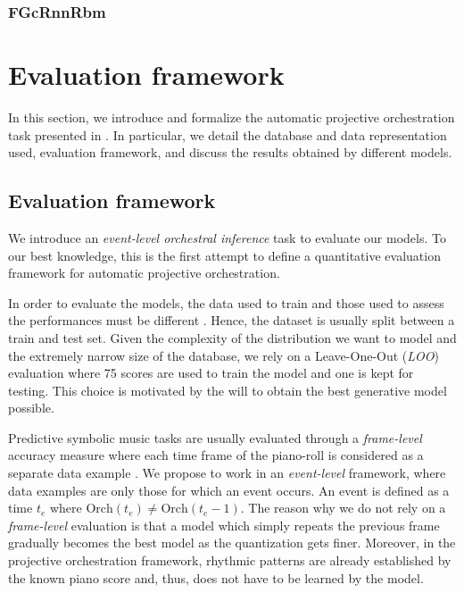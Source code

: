 \documentclass{article}
\begin{document}
\subsubsection{FGcRnnRbm}

\section{Evaluation framework}
In this section, we introduce and formalize the automatic projective orchestration task presented in . In particular, we detail the database and data representation used, evaluation framework, and discuss the results obtained by different models.

\subsection{Evaluation framework}
We introduce an \textit{event-level orchestral inference} task to evaluate our models. To our best knowledge, this is the first attempt to define a quantitative evaluation framework for automatic projective orchestration.

In order to evaluate the models, the data used to train and those used to assess the performances must be different \cite{bishop2006pattern}. Hence, the dataset is usually split between a train and test set.
Given the complexity of the distribution we want to model and the extremely narrow size of the database, we rely on a Leave-One-Out (\textit{LOO}) evaluation where 75 scores are used to train the model and one is kept for testing. This choice is motivated by the will to obtain the best generative model possible.

Predictive symbolic music tasks are usually evaluated through a \textit{frame-level} accuracy measure where each time frame of the piano-roll is considered as a separate data example \cite{DBLP:journals/corr/YaoCVDD15,boulanger2012modeling,lavrenko2003polyphonic}.
We propose to work in an \textit{event-level} framework, where data examples are only those for which an event occurs. An event is defined as a time $t_{e}$ where $\text{Orch}(t_{e}) \neq \text{Orch}(t_{e} - 1)$. The reason why we do not rely on a \textit{frame-level} evaluation is that a model which simply repeats the previous frame gradually becomes the best model as the quantization gets finer. Moreover, in the projective orchestration framework, rhythmic patterns are already established by the known piano score and, thus, does not have to be learned by the model.
\end{document}
